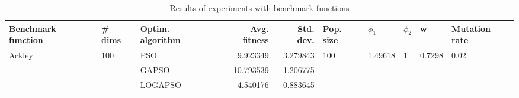 \begin{table}
\centering
\caption{Results of experiments with benchmark functions}
\begin{tabular}{lllrrlllll}
\toprule
     Benchmark function &              \# dims & Optim. algorithm &  Avg. fitness &  Std. dev. &            Pop. size &               $\phi_{1}$ &         $\phi_{2}$ &                       w &         Mutation rate \\
\midrule
\multirow{3}{*}{Ackley} & \multirow{3}{*}{100} &              PSO &      9.923349 &   3.279843 & \multirow{3}{*}{100} & \multirow{3}{*}{1.49618} & \multirow{3}{*}{1} & \multirow{3}{*}{0.7298} & \multirow{3}{*}{0.02} \\
                        &                      &            GAPSO &     10.793539 &   1.206775 &                      &                          &                    &                         &                       \\
                        &                      &          LOGAPSO &      4.540176 &   0.883645 &                      &                          &                    &                         &                       \\
\bottomrule
\end{tabular}
\end{table}
